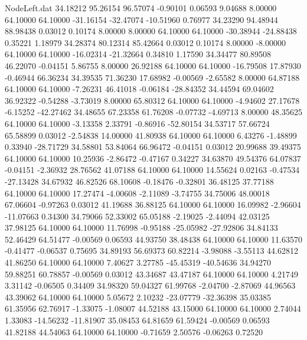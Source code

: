 \begin{filecontents}{NodeLeft.dat}
  34.18212   95.26154   96.57074    -0.90101    0.06593    9.04688    8.00000   64.10000   64.10000  -31.16154  -32.47074  -10.51960    0.76977
  34.23290   94.48944   88.98438     0.03012    0.10174    8.00000    8.00000   64.10000   64.10000  -30.38944  -24.88438    0.35221    1.18979
  34.28374   80.12314   85.42664     0.03012    0.10174    8.00000   -8.00000   64.10000   64.10000  -16.02314  -21.32664    0.34810    1.17590
  34.34477   80.89508   46.22070    -0.04151    5.86755    8.00000   26.92188   64.10000   64.10000  -16.79508   17.87930   -0.46944   66.36234
  34.39535   71.36230   17.68982    -0.00569   -2.65582    8.00000   64.87188   64.10000   64.10000   -7.26231   46.41018   -0.06184  -28.84352
  34.44594   69.04602   36.92322    -0.54288   -3.73019    8.00000   65.80312   64.10000   64.10000   -4.94602   27.17678   -6.15252  -42.27462
  34.48655   67.23358   61.76208    -0.07732   -4.69713    8.00000   48.35625   64.10000   64.10000   -3.13358    2.33791   -0.86916  -52.80154
  34.53717   57.66724   65.58899     0.03012   -2.54838   14.00000   41.80938   64.10000   64.10000    6.43276   -1.48899    0.33940  -28.71729
  34.58801   53.84064   66.96472    -0.04151    0.03012   20.99688   39.49375   64.10000   64.10000   10.25936   -2.86472   -0.47167    0.34227
  34.63870   49.54376   64.07837    -0.04151   -2.36932   28.76562   41.07188   64.10000   64.10000   14.55624    0.02163   -0.47534  -27.13428
  34.67932   46.82526   68.10608    -0.18476   -0.32801   36.48125   37.77188   64.10000   64.10000   17.27474   -4.00608   -2.11089   -3.74755
  34.75006   48.00018   67.06604    -0.97263    0.03012   41.19688   36.88125   64.10000   64.10000   16.09982   -2.96604  -11.07663    0.34300
  34.79066   52.33002   65.05188    -2.19025   -2.44094   42.03125   37.98125   64.10000   64.10000   11.76998   -0.95188  -25.05982  -27.92806
  34.84133   52.46429   64.51477    -0.00569    0.06593   44.93750   38.48438   64.10000   64.10000   11.63570   -0.41477   -0.06537    0.75695
  34.89193   56.69373   60.82214    -3.98088   -3.55113   44.62812   41.86250   64.10000   64.10000    7.40627    3.27785  -45.45319  -40.54636
  34.94270   59.88251   60.78857    -0.00569    0.03012   43.34687   43.47187   64.10000   64.10000    4.21749    3.31142   -0.06505    0.34409
  34.98320   59.04327   61.99768    -2.04700   -2.87069   44.96563   43.39062   64.10000   64.10000    5.05672    2.10232  -23.07779  -32.36398
  35.03385   61.35956   62.76917    -1.33075   -1.08007   44.52188   43.15000   64.10000   64.10000    2.74044    1.33083  -14.56232  -11.81907
  35.08453   64.81659   61.59424    -0.00569    0.06593   41.82188   44.54063   64.10000   64.10000   -0.71659    2.50576   -0.06263    0.72520

\end{filecontents}
